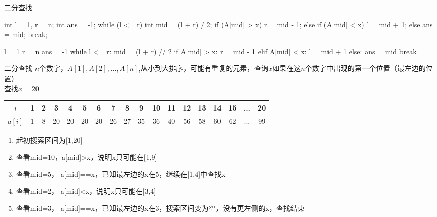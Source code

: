 \documentclass[aspectratio=169,xcolor=dvipsnames]{beamer}
\begin{document}
\begin{frame}[fragile]{二分查找}
    
\begin{minipage}{0.45\textwidth}
    \centering
    \begin{cppcode}
int l = 1, r = n;
int ans = -1;
while (l <= r) {
    int mid = (l + r) / 2;
    if (A[mid] > x) {
        r = mid - 1;
    } else if (A[mid] < x) {
        l = mid + 1;
    } else {
        ans = mid;
        break;
    }
}
    \end{cppcode}
\end{minipage}%
\hfill
\begin{minipage}{0.45\textwidth}
    \centering
    \begin{pycode}
l = 1
r = n
ans = -1
while l <= r:
    mid = (l + r) // 2
    if A[mid] > x:
        r = mid - 1
    elif A[mid] < x:
        l = mid + 1
    else:
        ans = mid
        break
    \end{pycode}
\end{minipage}

\end{frame}


\begin{frame}[fragile]{二分查找}
    $n$个数字，$A[1],A[2],\ldots,A[n]$,从小到大排序，可能有重复的元素，查询$x$如果在这$n$个数字中出现的第一个位置（最左边的位置）\\

    查找$x=20$
    \begin{table}[ht]
        \centering
        \begin{tabular}{|c|ccccccccccccccccc|}
        \hline
        $i$ & 1 & 2 & 3 & 4 & 5 & 6 & 7 & 8 & 9 & 10 & 11 & 12 & 13 & 14 & 15 & ... & 20 \\
        \hline
        $a[i]$ & 1 & 8 & 20 & 20 & 20 & 20 & 26 & 27 & 35 & 36 & 40 & 56 & 58 & 60 & 62 & ... & 99 \\
        \hline
        \end{tabular}
    \end{table}

    \begin{enumerate}
        \item 起初搜索区间为[1,20]
        \item 查看mid=10，a[mid]>x，说明x只可能在[1,9]
        \item 查看mid=5，  a[mid]==x，已知最左边的x在5，继续在[1,4]中查找x
        \item 查看mid=2，  a[mid]<x，说明x只可能在[3,4]
        \item 查看mid=3，  a[mid]==x，已知最左边的x在3，搜索区间变为空，没有更左侧的x，查找结束
    \end{enumerate}

\end{frame}
\end{document}
